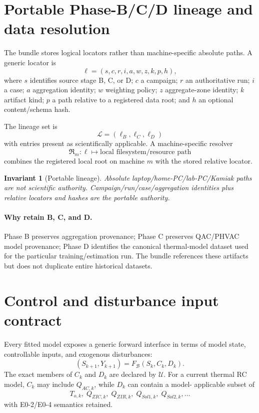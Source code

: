 \documentclass[11pt]{article}
\newcommand{\Bun}{\mathcal{B}}
\newcommand{\Lineage}{\mathcal{L}}
\newcommand{\InputSpec}{\mathcal{U}}
\newtheorem{invariant}{Invariant}
\begin{document}
\section{Portable Phase-B/C/D lineage and data resolution}

The bundle stores logical locators rather than machine-specific absolute paths.
A generic locator is
\[
\ell=(s,c,r,i,a,w,z,k,p,h),
\]
where $s$ identifies source stage B, C, or D; $c$ a campaign; $r$ an
authoritative run; $i$ a case; $a$ aggregation identity; $w$ weighting policy;
$z$ aggregate-zone identity; $k$ artifact kind; $p$ a path relative to a
registered data root; and $h$ an optional content/schema hash.

The lineage set is
\[
\boxed{\Lineage=(\ell_B,\ell_C,\ell_D)}
\]
with entries present as scientifically applicable. A machine-specific resolver
\[
\mathfrak R_m:\ell\mapsto \text{local filesystem/resource path}
\]
combines the registered local root on machine $m$ with the stored relative
locator.

\begin{invariant}[Portable lineage]
Absolute laptop/home-PC/lab-PC/Kamiak paths are not scientific authority.
Campaign/run/case/aggregation identities plus relative locators and hashes are
the portable authority.
\end{invariant}

\paragraph{Why retain B, C, and D.}
Phase B preserves aggregation provenance; Phase C preserves QAC/PHVAC model
provenance; Phase D identifies the canonical thermal-model dataset used for the
particular training/estimation run. The bundle references these artifacts but
does not duplicate entire historical datasets.

\section{Control and disturbance input contract}

Every fitted model exposes a generic forward interface in terms of model state,
controllable inputs, and exogenous disturbances:
\[
\boxed{
(S_{k+1},Y_{k+1})=F_{\Bun}(S_k,C_k,D_k).
}
\]
The exact members of $C_k$ and $D_k$ are declared by $\InputSpec$. For a current
thermal RC model, $C_k$ may include $Q_{AC,k}$, while $D_k$ can contain a model-
applicable subset of
\[
T_{o,k},\;Q_{ZIC,k},\;Q_{ZIR,k},\;Q_{Sol1,k},\;Q_{Sol2,k},\ldots
\]
with E0-2/E0-4 semantics retained.
\end{document}
